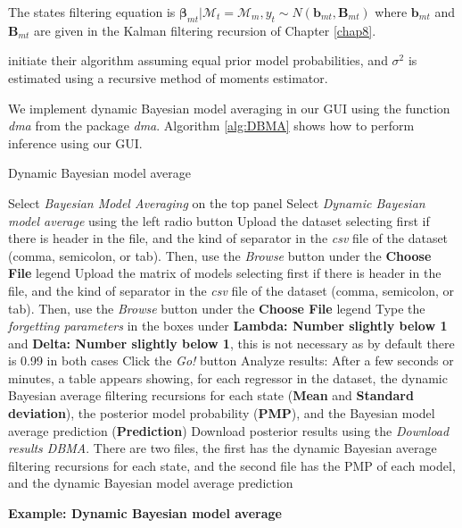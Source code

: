 The states filtering equation is $\bm{\beta}_{mt}|\mathcal{M}_{t}=\mathcal{M}_{m},y_{t}\sim N(\bm{b}_{mt},\bm{B}_{mt})$ where $\bm{b}_{mt}$ and $\bm{B}_{mt}$ are given in the Kalman filtering recursion of Chapter \ref{chap8}.

\cite{raftery2010online} initiate their algorithm assuming equal prior model probabilities, and $\sigma^2$ is estimated using a recursive method of moments estimator.

We implement dynamic Bayesian model averaging in our GUI using the function \textit{dma} from the package \textit{dma}. Algorithm \ref{alg:DBMA} shows how to perform inference using our GUI.

\begin{algorithm}[h!]
	\caption{Dynamic Bayesian model average}\label{alg:DBMA}
	\begin{algorithmic}[1]  		 			
		\State Select \textit{Bayesian Model Averaging} on the top panel
		\State Select \textit{Dynamic Bayesian model average} using the left radio button
		\State Upload the dataset selecting first if there is header in the file, and the kind of separator in the \textit{csv} file of the dataset (comma, semicolon, or tab). Then, use the \textit{Browse} button under the \textbf{Choose File} legend
		\State Upload the matrix of models selecting first if there is header in the file, and the kind of separator in the \textit{csv} file of the dataset (comma, semicolon, or tab). Then, use the \textit{Browse} button under the \textbf{Choose File} legend
		\State Type the \textit{forgetting parameters} in the boxes under \textbf{Lambda: Number slightly below 1} and \textbf{Delta: Number slightly below 1}, this is not necessary as by default there is 0.99 in both cases  
		\State Click the \textit{Go!} button
		\State Analyze results: After a few seconds or minutes, a table appears showing, for each regressor in the dataset, the dynamic Bayesian average filtering recursions for each state (\textbf{Mean} and \textbf{Standard deviation}), the posterior model probability (\textbf{PMP}), and the Bayesian model average prediction (\textbf{Prediction})
		\State Download posterior results using the \textit{Download results DBMA}. There are two files, the first has the dynamic Bayesian average filtering recursions for each state, and the second file has the PMP of each model, and the dynamic Bayesian model average prediction
	\end{algorithmic} 
\end{algorithm}

\textbf{Example: Dynamic Bayesian model average}

